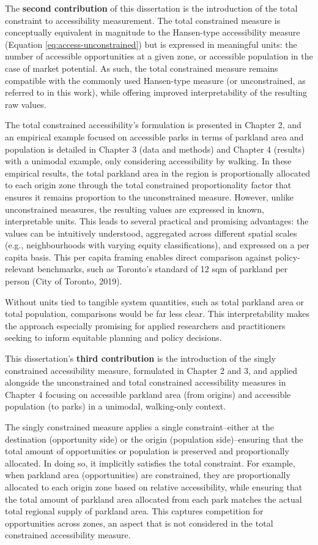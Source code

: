 \documentclass[
11pt, %
oneside, %
english, %
singlespacing, %
]{macthesis} %
\begin{document}
The \textbf{second contribution} of this dissertation is the introduction of the total constraint to accessibility measurement. The total constrained measure is conceptually equivalent in magnitude to the Hansen-type accessibility measure (Equation \ref{eq:access-unconstrained}) but is expressed in meaningful units: the number of accessible opportunities at a given zone, or accessible population in the case of market potential. As such, the total constrained measure remains compatible with the commonly used Hansen-type measure (or unconstrained, as referred to in this work), while offering improved interpretability of the resulting raw values.

The total constrained accessibility's formulation is presented in Chapter 2, and an empirical example focused on accessible parks in terms of parkland area and population is detailed in Chapter 3 (data and methods) and Chapter 4 (results) with a unimodal example, only considering accessibility by walking. In these empirical results, the total parkland area in the region is proportionally allocated to each origin zone through the total constrained proportionality factor that ensures it remains proportion to the unconstrained measure. However, unlike unconstrained measures, the resulting values are expressed in known, interpretable units. This leads to several practical and promising advantages: the values can be intuitively understood, aggregated across different spatial scales (e.g., neighbourhoods with varying equity classifications), and expressed on a per capita basis. This per capita framing enables direct comparison against policy-relevant benchmarks, such as Toronto's standard of 12 sqm of parkland per person (City of Toronto, 2019).

Without units tied to tangible system quantities, such as total parkland area or total population, comparisons would be far less clear. This interpretability makes the approach especially promising for applied researchers and practitioners seeking to inform equitable planning and policy decisions.

This dissertation's \textbf{third contribution} is the introduction of the singly constrained accessibility measure, formulated in Chapter 2 and 3, and applied alongside the unconstrained and total constrained accessibility measures in Chapter 4 focusing on accessible parkland area (from origins) and accessible population (to parks) in a unimodal, walking-only context.

The singly constrained measure applies a single constraint--either at the destination (opportunity side) or the origin (population side)--ensuring that the total amount of opportunities or population is preserved and proportionally allocated. In doing so, it implicitly satisfies the total constraint. For example, when parkland area (opportunities) are constrained, they are proportionally allocated to each origin zone based on relative accessibility, while ensuring that the total amount of parkland area allocated from each park matches the actual total regional supply of parkland area. This captures competition for opportunities across zones, an aspect that is not considered in the total constrained accessibility measure.
\end{document}
